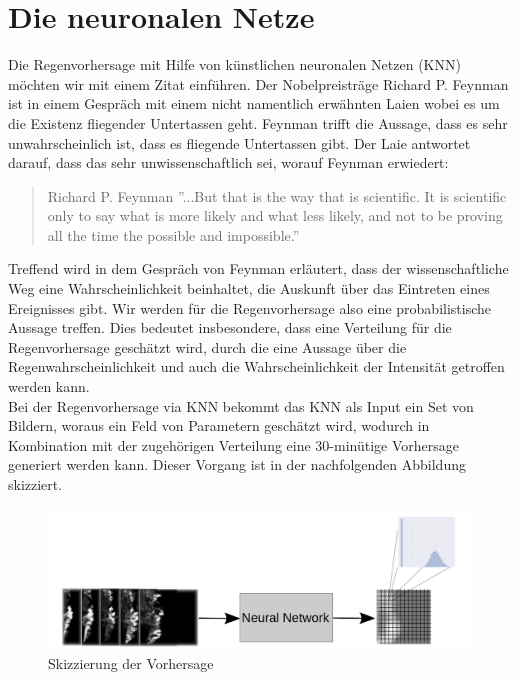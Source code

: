 \newpage

\section{Die neuronalen Netze}\label{die neuronalen netze}

Die Regenvorhersage mit Hilfe von künstlichen neuronalen Netzen (KNN) möchten wir mit einem Zitat einführen.
Der Nobelpreisträge Richard P. Feynman ist in einem Gespräch mit einem nicht namentlich erwähnten Laien wobei es um die Existenz fliegender Untertassen geht. Feynman trifft die Aussage, dass es sehr unwahrscheinlich ist, dass es fliegende Untertassen gibt. Der Laie antwortet darauf, dass das sehr unwissenschaftlich sei, worauf Feynman erwiedert:

\begin{quote}{Richard P. Feynman}
''...But that is the way that is scientific. It is scientific only to say what is more likely and what less likely, and not to be proving all the time the possible and impossible.''  
\end{quote}

\noindent Treffend wird in dem Gespräch von Feynman erläutert, dass der wissenschaftliche Weg eine Wahrscheinlichkeit beinhaltet, die Auskunft über das Eintreten eines Ereignisses gibt. Wir werden für die Regenvorhersage also eine probabilistische Aussage treffen. Dies bedeutet insbesondere, dass eine Verteilung für die Regenvorhersage geschätzt wird, durch die eine Aussage über die Regenwahrscheinlichkeit und auch die Wahrscheinlichkeit der Intensität getroffen werden kann.\\

\noindent Bei der Regenvorhersage via KNN bekommt das KNN als Input ein Set von Bildern, woraus ein Feld von Parametern geschätzt wird, wodurch in Kombination mit der zugehörigen Verteilung eine 30-minütige Vorhersage generiert werden kann. Dieser Vorgang ist in der nachfolgenden Abbildung skizziert.


\begin{figure}[htb]
 \centering
 \includegraphics[width=1.0\textwidth,angle=0]{abb/skizzierung_regenvorhersage}
 \caption{Skizzierung der Vorhersage}
\label{fig:Vorhersage_skizze}
\end{figure}

